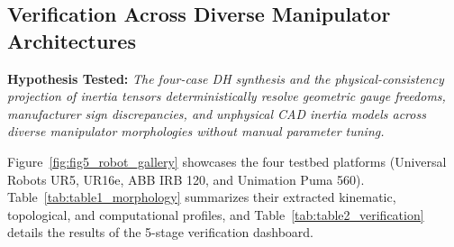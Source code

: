 \documentclass[fleqn,10pt]{article}
\begin{document}
\subsection{Verification Across Diverse Manipulator Architectures}

\noindent\textbf{Hypothesis Tested:} \textit{The four-case DH synthesis and the physical-consistency projection of inertia tensors deterministically resolve geometric gauge freedoms, manufacturer sign discrepancies, and unphysical CAD inertia models across diverse manipulator morphologies without manual parameter tuning.}

Figure~\ref{fig:fig5_robot_gallery} showcases the four testbed platforms (Universal Robots UR5, UR16e, ABB IRB 120, and Unimation Puma 560). Table~\ref{tab:table1_morphology} summarizes their extracted kinematic, topological, and computational profiles, and Table~\ref{tab:table2_verification} details the results of the 5-stage verification dashboard.
\end{document}
